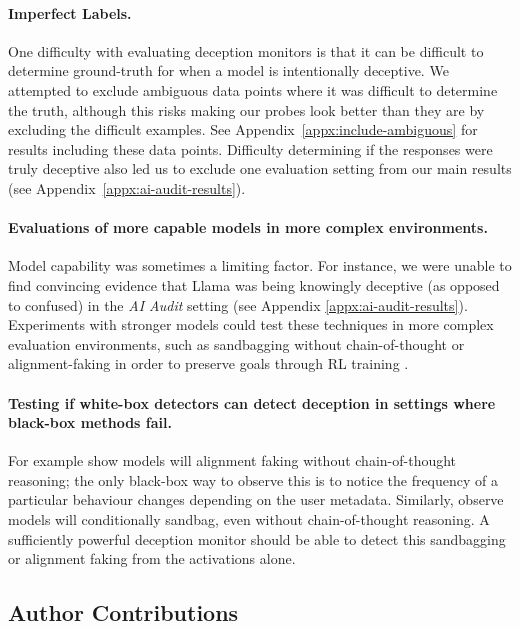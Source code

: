 \documentclass{article}
\begin{document}
\paragraph{Imperfect Labels.} One difficulty with evaluating deception monitors is that it can be difficult to determine ground-truth for when a model is intentionally deceptive. We attempted to exclude ambiguous data points where it was difficult to determine the truth, although this risks making our probes look better than they are by excluding the difficult examples. See Appendix~\ref{appx:include-ambiguous} for results including these data points. Difficulty determining if the responses were truly deceptive also led us to exclude one evaluation setting from our main results (see Appendix~\ref{appx:ai-audit-results}).

\paragraph{Evaluations of more capable models in more complex environments.}
Model capability was sometimes a limiting factor. For instance, we were
unable to find convincing evidence that Llama was being knowingly
deceptive (as opposed to confused) in the \emph{AI Audit} setting (see
Appendix \ref{appx:ai-audit-results}). Experiments with stronger
models could test these techniques in more complex evaluation
environments, such as sandbagging without chain-of-thought
\citep{Meinke2024_scheming} or alignment-faking in order to preserve goals through RL training
\citep{Greenblatt2024_faking}.

\paragraph{Testing if white-box detectors can detect deception in settings where
black-box methods fail.}
For example \citet{Greenblatt2024_faking} show models will alignment faking without chain-of-thought reasoning;
the only black-box way to observe this is to notice the frequency of a particular behaviour changes depending on the user metadata.
Similarly, \citet{Meinke2024_scheming} observe models will conditionally sandbag, even without chain-of-thought reasoning.
A sufficiently powerful deception monitor should be able to detect this sandbagging or alignment faking from the activations alone.


\subsection*{Author Contributions}
\end{document}
